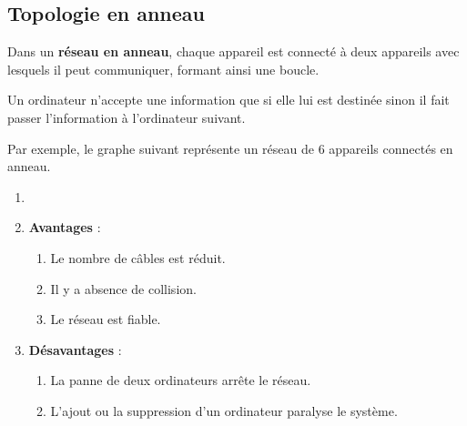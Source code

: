\documentclass[11pt, a4paper]{book}
\begin{document}
\subsection{Topologie en anneau}
\begin{defi}
Dans un {\bf réseau en anneau}, chaque appareil est connecté à deux appareils avec lesquels il peut communiquer, formant ainsi une boucle.

\noindent Un ordinateur n'accepte une information que si elle lui est destinée sinon il fait passer l'information à l'ordinateur suivant.
\end{defi}

Par exemple, le graphe suivant représente un réseau de 6 appareils connectés en anneau.




\begin{center}
\end{center}



\begin{remarques}
\begin{enumerate}
\item[]
\item {\bf Avantages} : 
	\begin{enumerate}
		\item Le nombre de câbles est réduit.
		\item Il y a absence de collision.
		\item Le réseau est fiable.\\
	\end{enumerate}
\item {\bf Désavantages} :
	\begin{enumerate}
		\item La panne de deux ordinateurs arrête le réseau.
		\item L'ajout ou la suppression d'un ordinateur paralyse le système.
	\end{enumerate}
\end{enumerate}
\end{remarques}
\end{document}
